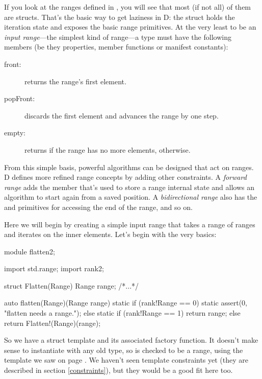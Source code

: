 If you look at the ranges defined in , you will see that most (if not all) of them are structs. That's the basic way to get laziness in D: the struct holds the iteration state and exposes the basic range primitives. At the very least to be an \emph{input range}---the simplest kind of range---a type must have the following members (be they properties, member functions or manifest constants):

\begin{description}
\item[front:] returns the range's first element.
\item[popFront:] discards the first element and advances the range by one step.
\item[empty:] returns  if the range has no more elements,  otherwise.
\end{description}

From this simple basis, powerful algorithms can be designed that act on ranges. D defines more refined range concepts by adding other constraints. A \emph{forward range} adds the  member that's used to store a range internal state and allows an algorithm to start again from a saved position. A \emph{bidirectional range} also has the  and  primitives for accessing the end of the range, and so on.

Here we will begin by creating a simple input range that takes a range of ranges and iterates on the inner elements. Let's begin with the very basics:

\begin{dcode}
module flatten2;

import std.range;
import rank2;

struct Flatten(Range)
{
    Range range;
    /*...*/
}

auto flatten(Range)(Range range)
{ 
    static if (rank!Range == 0)
        static assert(0, "flatten needs a range.");
    else static if (rank!Range == 1)
        return range;
    else
        return Flatten!(Range)(range);
}
\end{dcode}

So we have a struct template and its associated factory function. It doesn't make sense to instantiate  with any old type, so  is checked to be a range, using the  template we saw on page \pageref{rankforranges}. We haven't seen template constraints yet (they are described in section \ref{constraints}), but they would be a good fit here too.

